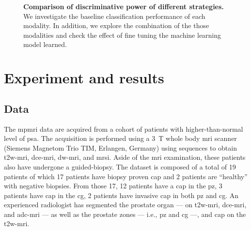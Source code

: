 \documentclass[final,3p,times,twocolumn]{elsarticle}
\begin{document}
\begin{figure}
  \hspace*{\fill}
  \hfill
  \hspace*{\fill}
  \caption[]{\textbf{Comparison of discriminative power of different
      strategies.} We investigate the baseline classification performance of
    each modality. In addition, we explore the combination of the those
    modalities and check the effect of fine tuning the machine learning model
    learned.}
  \label{fig:summary_single_modality}
\end{figure}

\section{Experiment and results}\label{sec:experiments}

\subsection{Data}\label{sec:data}

The \ac{mpmri} data are acquired from a cohort of patients with
higher-than-normal level of \ac{psa}.  The acquisition is performed using a
\SI{3}{\tesla} whole body \ac{mri} scanner (Siemens Magnetom Trio TIM,
Erlangen, Germany) using sequences to obtain \ac{t2w}-\ac{mri},
\ac{dce}-\ac{mri}, \ac{dw}-\ac{mri}, and \ac{mrsi}.  Aside of the \ac{mri}
examination, these patients also have undergone a guided-biopsy.  The dataset
is composed of a total of 19 patients of which 17 patients have biopsy proven
\ac{cap} and 2 patients are ``healthy'' with negative biopsies.  From those 17,
12 patients have a \ac{cap} in the \ac{pz}, 3 patients have \ac{cap} in the
\ac{cg}, 2 patients have invasive \ac{cap} in both \ac{pz} and \ac{cg}.  An
experienced radiologist has segmented the prostate organ --- on
\ac{t2w}-\ac{mri}, \ac{dce}-\ac{mri}, and \ac{adc}-\ac{mri} --- as well as the
prostate zones --- i.e., \ac{pz} and \ac{cg} ---, and \ac{cap} on the
\ac{t2w}-\ac{mri}.
\end{document}
